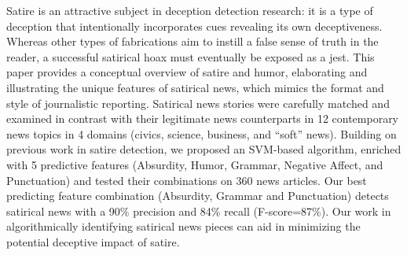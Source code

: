 Satire is an attractive subject in deception detection research: it is a type of deception that intentionally incorporates cues revealing its own deceptiveness. Whereas other types of fabrications aim to instill a false sense of truth in the reader, a successful satirical hoax must eventually be exposed as a jest. This paper provides a conceptual overview of satire and humor, elaborating and illustrating the unique features of satirical news, which mimics the format and style of journalistic reporting. Satirical news stories were carefully matched and examined in contrast with their legitimate news counterparts in 12 contemporary news topics in 4 domains (civics, science, business, and ``soft'' news). Building on previous work in satire detection, we proposed an SVM-based algorithm, enriched with 5 predictive features (Absurdity, Humor, Grammar, Negative Affect, and Punctuation) and tested their combinations on 360 news articles. Our best predicting feature combination (Absurdity, Grammar and Punctuation) detects satirical news with a 90\% precision and 84\% recall (F-score=87\%). Our work in algorithmically identifying satirical news pieces can aid in minimizing the potential deceptive impact of satire.
